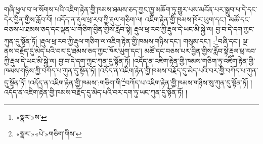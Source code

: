 གཞི་ཕྱལ་བ་ལ་སོགས་པའི་འཇིག་རྟེན་གྱི་ཁམས་ཐམས་ཅད་ཀྱང་ཁྱུ་མཆོག་ཏུ་གྱུར་པས་མངོན་པར་སྒྲུབ་པ་དེ་དང་དེར་བྱིན་གྱིས་རློབ་བོ། །འདོད་ན་རྡུལ་ཕྲ་རབ་ཀྱི་རྡུལ་གཅིག་ལ། འཇིག་རྟེན་གྱི་ཁམས་ཁོར་ཡུག་དང་། མཚོ་དང་བཅས་པ་ཐམས་ཅད་དང་ལྡན་པ་གཅིག་བྱིན་གྱིས་རློབ་སྟེ། རྡུལ་ཕྲ་རབ་ཀྱི་རྡུལ་དེ་ཡང་མི་སྐྱེ་ལ། བྱ་བ་དེ་དག་ཀྱང་ཀུན་དུ་སྟོན་ཏོ། །རྡུལ་ཕྲ་རབ་ཀྱི་རྡུལ་གཅིག་ལ་འཇིག་རྟེན་གྱི་ཁམས་གཉིས་དང་། གསུམ་དང་། :\footnote{«སྣར་»ས་}བཞི་དང་། ལྔ་ནས་བརྗོད་དུ་མེད་པའི་བར་དུ་ཐམས་ཅད་ཀྱང་ཁོར་ཡུག་དང་། མཚོ་དང་བཅས་པར་བྱིན་གྱིས་རློབ་སྟེ་རྡུལ་ཕྲ་རབ་ཀྱི་རྡུལ་དེ་ཡང་མི་སྐྱེ་ལ། བྱ་བ་དེ་དག་ཀྱང་ཀུན་དུ་སྟོན་ཏོ། །འདོད་ན་འཇིག་རྟེན་གྱི་ཁམས་གཅིག་ཏུ་འཇིག་རྟེན་གྱི་ཁམས་གཉིས་ཀྱི་བཀོད་པ་ཀུན་དུ་སྟོན་ཏོ། །འདོད་ན་འཇིག་རྟེན་གྱི་ཁམས་བརྗོད་དུ་མེད་པའི་བར་གྱི་བཀོད་པ་ཀུན་དུ་སྟོན་ཏོ། །འདོད་ན་འཇིག་རྟེན་གྱི་ཁམས་:གཅིག་གི་\footnote{«སྣར་»«པེ་»གཅིག་གིས་}བཀོད་པ་འཇིག་རྟེན་གྱི་ཁམས་གཉིས་སུ་ཀུན་དུ་སྟོན་ཏོ། །འདོད་ན་འཇིག་རྟེན་གྱི་ཁམས་བརྗོད་དུ་མེད་པའི་བར་དག་ཏུ་ཡང་ཀུན་དུ་སྟོན་ཏོ། །
